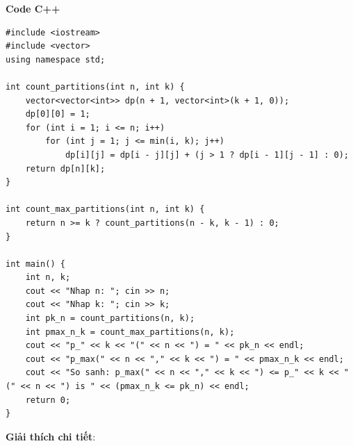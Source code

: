 \documentclass[a4paper,12pt]{article}
\begin{document}
\textbf{Code C++}
\begin{lstlisting}[style=cppstyle]
#include <iostream>
#include <vector>
using namespace std;

int count_partitions(int n, int k) {
    vector<vector<int>> dp(n + 1, vector<int>(k + 1, 0));
    dp[0][0] = 1;
    for (int i = 1; i <= n; i++)
        for (int j = 1; j <= min(i, k); j++)
            dp[i][j] = dp[i - j][j] + (j > 1 ? dp[i - 1][j - 1] : 0);
    return dp[n][k];
}

int count_max_partitions(int n, int k) {
    return n >= k ? count_partitions(n - k, k - 1) : 0;
}

int main() {
    int n, k;
    cout << "Nhap n: "; cin >> n;
    cout << "Nhap k: "; cin >> k;
    int pk_n = count_partitions(n, k);
    int pmax_n_k = count_max_partitions(n, k);
    cout << "p_" << k << "(" << n << ") = " << pk_n << endl;
    cout << "p_max(" << n << "," << k << ") = " << pmax_n_k << endl;
    cout << "So sanh: p_max(" << n << "," << k << ") <= p_" << k << "(" << n << ") is " << (pmax_n_k <= pk_n) << endl;
    return 0;
}
\end{lstlisting}
\textbf{Giải thích chi tiết}:
\end{document}
